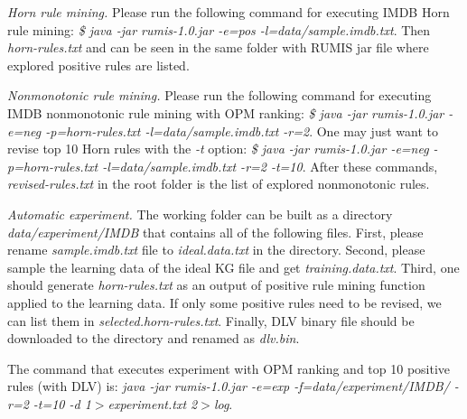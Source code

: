 \textit{Horn rule mining.} Please run the following command for executing IMDB Horn rule mining: \textit{\$ java -jar rumis-1.0.jar -e=pos -l=data/sample.imdb.txt}. Then \textit{horn-rules.txt} and can be seen in the same folder with RUMIS jar file where explored positive rules are listed.

\textit{Nonmonotonic rule mining.} Please run the following command for executing IMDB nonmonotonic rule mining with OPM ranking: \textit{\$ java -jar rumis-1.0.jar -e=neg -p=horn-rules.txt -l=data/sample.imdb.txt -r=2}. One may just want to revise top 10 Horn rules with the \textit{-t} option: \textit{\$ java -jar rumis-1.0.jar -e=neg -p=horn-rules.txt -l=data/sample.imdb.txt -r=2 -t=10}. After these commands, \textit{revised-rules.txt} in the root folder is the list of explored nonmonotonic rules.

\textit{Automatic experiment.} The working folder can be built as a directory \textit{data/experiment/IMDB} that contains all of the following files. First, please rename \textit{sample.imdb.txt} file to \textit{ideal.data.txt} in the directory. Second, please sample the learning data of the ideal KG file and get \textit{training.data.txt}. Third, one should generate \textit{horn-rules.txt} as an output of positive rule mining function applied to the learning data. If only some positive rules need to be revised, we can list them in \textit{selected.horn-rules.txt}. Finally, DLV binary file should be downloaded to the directory and renamed as \textit{dlv.bin}.

The command that executes experiment with OPM ranking and top 10 positive rules (with DLV) is: \textit{java -jar rumis-1.0.jar -e=exp -f=data/experiment/IMDB/ -r=2 -t=10 -d 1$>$experiment.txt 2$>$log}.

